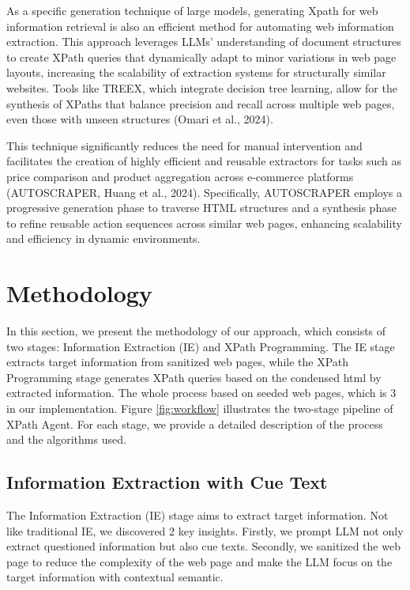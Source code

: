\documentclass[a4paper]{article}
\begin{document}
As a specific generation technique of large models, generating Xpath for web information retrieval is also an efficient method for automating web information extraction. This approach leverages LLMs’ understanding of document structures to create XPath queries that dynamically adapt to minor variations in web page layouts, increasing the scalability of extraction systems for structurally similar websites. Tools like TREEX, which integrate decision tree learning, allow for the synthesis of XPaths that balance precision and recall across multiple web pages, even those with unseen structures (Omari et al., 2024). 

This technique significantly reduces the need for manual intervention and facilitates the creation of highly efficient and reusable extractors for tasks such as price comparison and product aggregation across e-commerce platforms (AUTOSCRAPER, Huang et al., 2024). Specifically, AUTOSCRAPER employs a progressive generation phase to traverse HTML structures and a synthesis phase to refine reusable action sequences across similar web pages, enhancing scalability and efficiency in dynamic environments.


\section{Methodology}

In this section, we present the methodology of our approach, which consists of two stages: Information Extraction (IE) and XPath Programming. The IE stage extracts target information from sanitized web pages, while the XPath Programming stage generates XPath queries based on the condensed html by extracted information. The whole process based on seeded web pages, which is 3 in our implementation. Figure \ref{fig:workflow} illustrates the two-stage pipeline of XPath Agent. For each stage, we provide a detailed description of the process and the algorithms used.

\subsection{Information Extraction with Cue Text}

The Information Extraction (IE) stage aims to extract target information. Not like traditional IE, we discovered 2 key insights. Firstly, we prompt LLM not only extract questioned information but also cue texts. Secondly, we sanitized the web page to reduce the complexity of the web page and make the LLM focus on the target information with contextual semantic.
\end{document}
